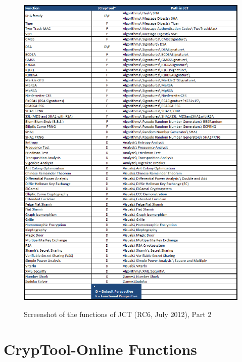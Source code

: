 \clearpage
\begin{figure}[hb]
\begin{center}
\vspace{-30pt}
\includegraphics[scale=0.8, angle=0] {figures/JCT-functions-en-2}
\hypertarget{functions-overview-2-JCT}{}
\caption{Screenshot of the functions of JCT (RC6, July 2012), Part 2} 
\label{functions-overview-2-JCT}
\end{center}
\end{figure}
\clearpage





\newpage
\hypertarget{appendix-function-overview-CTO}{}
\section{CrypTool-Online Functions}
\label{s:appendix-function-overview-CTO}

